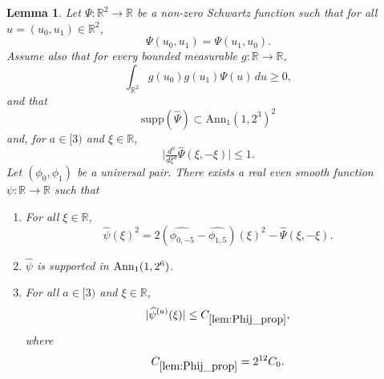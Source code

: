 \documentclass[12pt,reqno]{amsart}
\theoremstyle{plain}
\newtheorem{lemma}[theorem]{Lemma}
\numberwithin{equation}{section}
\theoremstyle{remark}
\newcommand{\using}[1]{}
\newcommand{\R}{{\mathbb R}}
\begin{document}
\begin{lemma}
\label{lem:Phij_prop}\using{lem:Phipos_v2}
Let $\Psi:\mathbb{R}^2\to\mathbb{R}$ be a non-zero Schwartz function such that for all $u=(u_0,u_1)\in\R^2$,
\begin{equation}\label{auto:Phij-symmetry-assumption}
\Psi(u_0,u_1)=\Psi(u_1,u_0).
\end{equation}
Assume also that for every bounded measurable $g:\R\to\R$,
\begin{equation}\label{auto:Phij-positivity-assumption}
\int_{\R^2}g(u_0)g(u_1)\Psi(u)\,du\ge0,
\end{equation}
and that
\begin{equation}\label{auto:Phij-Fourier-support-assumption}
\mathrm{supp}(\widehat{\Psi}) \subset \mathrm{Ann}_1(1, 2^3)^2
\end{equation}
and, for $a\in [3)$ and $\xi \in \R$,
\begin{equation}\label{Phij_psi_der}
\Big|\tfrac{d^a}{d\xi^{a}} \widehat{\Psi}(\xi,-\xi)\Big| \leq 1.
\end{equation}
Let $(\phi_0,\phi_1)$ be a universal pair. There exists a real even smooth function $\psi:\R\to \R$ such that
\begin{enumerate}
\item For all $\xi\in\R$,
\begin{equation}\label{Phij_psi_diag}
\widehat{\psi}(\xi)^2 = 2 (\widehat{\phi_{0,-5}}-\widehat{\phi_{1,5}})(\xi)^2 - \widehat{\Psi}(\xi,-\xi).
\end{equation}
\item $\widehat{\psi}$ is supported in $\textup{Ann}_1(1,2^6)$.
\item For all $a\in [3)$ and $\xi\in \R$,
\begin{equation}\label{psi_decay}
|\widehat{\psi}^{(a)}(\xi)|\le C_{\ref{lem:Phij_prop}},
\end{equation}
where
\begin{equation}\label{auto:Phij-constant-definition}
C_{\ref{lem:Phij_prop}}=2^{12}C_0.
\end{equation}
\end{enumerate}
\end{lemma}
\end{document}
